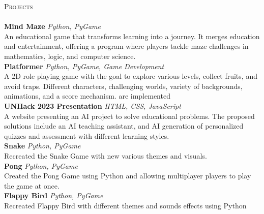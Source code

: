 \documentclass[a4paper]{article}
\newcommand{\lineunder} {
	\vspace*{-8pt} \\
	\hspace*{-18pt} \hrulefill \\
}
\newcommand{\header} [1] {
	{\hspace*{-18pt}\vspace*{6pt} \textsc{#1}}
	\vspace*{-6pt} \lineunder
}
\begin{document}
	\header{Projects}
	\hspace{-3mm}
	{\textbf{Mind Maze \textbar{}}} {\sl Python, PyGame} \\
		An educational game that transforms learning into a journey. It merges education and entertainment, offering a program where players tackle maze challenges in mathematics, logic, and computer science.\\
	\vspace*{2mm}
	\hspace{-3mm}
	{\textbf{Platformer \textbar{}}} {\sl Python, PyGame, Game Development} \\
	A 2D role playing-game with the goal to explore various levels, collect fruits, and avoid traps. Different characters, challenging worlds, variety of backgrounds, animations, and a score mechanism. are implemented\\
	\vspace*{2mm}
	\hspace{-3mm}
	{\textbf{UNHack 2023 Presentation \textbar{}}} {\sl HTML, CSS, JavaScript} \\
	A website presenting an AI project to solve educational problems. The proposed solutions include an AI teaching assistant, and AI generation of personalized quizzes and assessment with different learning styles.\\
	\vspace*{2mm}
	\hspace{-3mm}
	{\textbf{Snake \textbar{}}} {\sl Python, PyGame} \\
	Recreated the Snake Game with new various themes and visuals.\\
	\vspace*{2mm}
	\hspace{-3mm}
	{\textbf{Pong \textbar{}}} {\sl Python, PyGame} \\
	Created the Pong Game using Python and allowing multiplayer players to play the game at once.\\
	\vspace*{2mm}
	\hspace{-3mm}
	{\textbf{Flappy Bird \textbar{}}} {\sl Python, PyGame} \\
	Recreated Flappy Bird with different themes and sounds effects using Python\\
	\vspace*{2mm}
	
\end{document}
